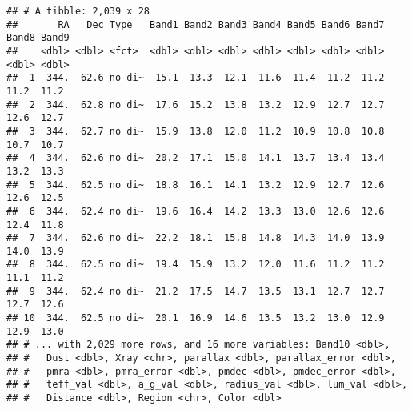 \documentclass[]{article}
\newenvironment{Shaded}{\begin{snugshade}}{\end{snugshade}}
\newcommand{\CommentTok}[1]{\textcolor[rgb]{0.56,0.35,0.01}{\textit{#1}}}
\newcommand{\DataTypeTok}[1]{\textcolor[rgb]{0.13,0.29,0.53}{#1}}
\newcommand{\KeywordTok}[1]{\textcolor[rgb]{0.13,0.29,0.53}{\textbf{#1}}}
\newcommand{\NormalTok}[1]{#1}
\newcommand{\OperatorTok}[1]{\textcolor[rgb]{0.81,0.36,0.00}{\textbf{#1}}}
\newcommand{\StringTok}[1]{\textcolor[rgb]{0.31,0.60,0.02}{#1}}
\begin{document}
\begin{Shaded}
\end{Shaded}

\begin{verbatim}
## # A tibble: 2,039 x 28
##       RA   Dec Type   Band1 Band2 Band3 Band4 Band5 Band6 Band7 Band8 Band9
##    <dbl> <dbl> <fct>  <dbl> <dbl> <dbl> <dbl> <dbl> <dbl> <dbl> <dbl> <dbl>
##  1  344.  62.6 no di~  15.1  13.3  12.1  11.6  11.4  11.2  11.2  11.2  11.2
##  2  344.  62.8 no di~  17.6  15.2  13.8  13.2  12.9  12.7  12.7  12.6  12.7
##  3  344.  62.7 no di~  15.9  13.8  12.0  11.2  10.9  10.8  10.8  10.7  10.7
##  4  344.  62.6 no di~  20.2  17.1  15.0  14.1  13.7  13.4  13.4  13.2  13.3
##  5  344.  62.5 no di~  18.8  16.1  14.1  13.2  12.9  12.7  12.6  12.6  12.5
##  6  344.  62.4 no di~  19.6  16.4  14.2  13.3  13.0  12.6  12.6  12.4  11.8
##  7  344.  62.6 no di~  22.2  18.1  15.8  14.8  14.3  14.0  13.9  14.0  13.9
##  8  344.  62.5 no di~  19.4  15.9  13.2  12.0  11.6  11.2  11.2  11.1  11.2
##  9  344.  62.4 no di~  21.2  17.5  14.7  13.5  13.1  12.7  12.7  12.7  12.6
## 10  344.  62.5 no di~  20.1  16.9  14.6  13.5  13.2  13.0  12.9  12.9  13.0
## # ... with 2,029 more rows, and 16 more variables: Band10 <dbl>,
## #   Dust <dbl>, Xray <chr>, parallax <dbl>, parallax_error <dbl>,
## #   pmra <dbl>, pmra_error <dbl>, pmdec <dbl>, pmdec_error <dbl>,
## #   teff_val <dbl>, a_g_val <dbl>, radius_val <dbl>, lum_val <dbl>,
## #   Distance <dbl>, Region <chr>, Color <dbl>
\end{verbatim}
\end{document}
